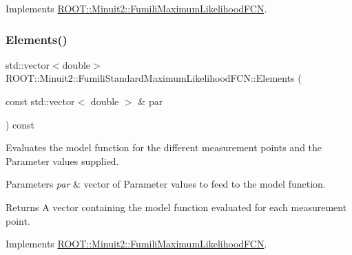 Implements \mbox{\hyperlink{classROOT_1_1Minuit2_1_1FumiliMaximumLikelihoodFCN_a20aa81dc23ba61ed49ba78f4f9627e59}{R\+O\+O\+T\+::\+Minuit2\+::\+Fumili\+Maximum\+Likelihood\+F\+CN}}.

\mbox{\label{classROOT_1_1Minuit2_1_1FumiliStandardMaximumLikelihoodFCN_af104474f9095c245b467f9db554a126a}} 
\subsubsection{\texorpdfstring{Elements()}{Elements()}\hspace{0.1cm}{\footnotesize\ttfamily [3/3]}}
{\footnotesize\ttfamily std\+::vector$<$double$>$ R\+O\+O\+T\+::\+Minuit2\+::\+Fumili\+Standard\+Maximum\+Likelihood\+F\+C\+N\+::\+Elements (\begin{DoxyParamCaption}\item[{const std\+::vector$<$ double $>$ \&}]{par }\end{DoxyParamCaption}) const\hspace{0.3cm}{\ttfamily [virtual]}}

Evaluates the model function for the different measurement points and the Parameter values supplied.


\begin{DoxyParams}{Parameters}
{\em par} & vector of Parameter values to feed to the model function.\\
\hline
\end{DoxyParams}
\begin{DoxyReturn}{Returns}
A vector containing the model function evaluated for each measurement point. 
\end{DoxyReturn}


Implements \mbox{\hyperlink{classROOT_1_1Minuit2_1_1FumiliMaximumLikelihoodFCN_a20aa81dc23ba61ed49ba78f4f9627e59}{R\+O\+O\+T\+::\+Minuit2\+::\+Fumili\+Maximum\+Likelihood\+F\+CN}}.

\mbox{\label{classROOT_1_1Minuit2_1_1FumiliStandardMaximumLikelihoodFCN_a37e72fc87092e5699066098fa5a31235}} 
